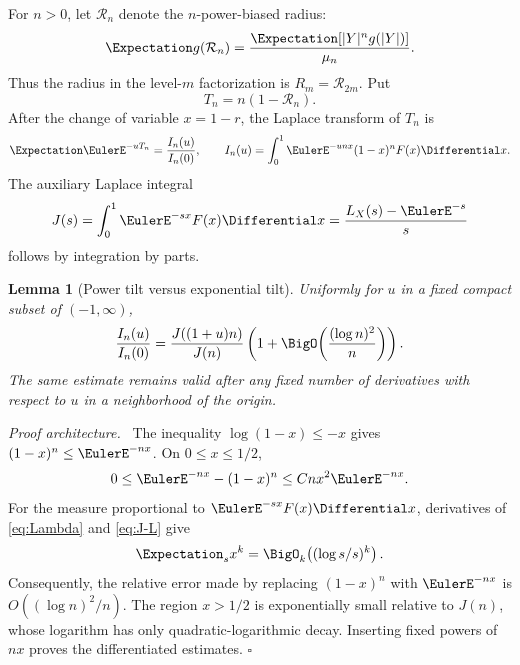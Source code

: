 \documentclass[11pt,oneside]{article}
\newtheorem{lemma}[theorem]{Lemma}
\theoremstyle{definition}
\theoremstyle{remark}
\newenvironment{proofidea}{\par\smallskip\noindent\textit{Proof architecture.}\ }{\hfill$\square$\par\smallskip}
\begin{document}
For $n>0$, let $\mathcal R_n$ denote the $n$-power-biased radius:
\begin{equation}
 \Expectation g(\mathcal R_n)
 =\frac{\Expectation[|Y|^ng(|Y|)]}{\mu_n}.                   \label{eq:Rn-general}
\end{equation}
Thus the radius in the level-$m$ factorization is
$R_m=\mathcal R_{2m}$.  Put
\begin{equation}
 T_n=n(1-\mathcal R_n).                             \label{eq:Tn}
\end{equation}
After the change of variable $x=1-r$, the Laplace transform of $T_n$ is
\begin{equation}
 \Expectation\EulerE^{-uT_n}
 =\frac{I_n(u)}{I_n(0)},
 \qquad
 I_n(u)=\int_0^1\EulerE^{-unx}(1-x)^nF(x)\Differential x.          \label{eq:In}
\end{equation}
The auxiliary Laplace integral
\begin{equation}
 J(s)=\int_0^1\EulerE^{-sx}F(x)\Differential x
 =\frac{L_X(s)-\EulerE^{-s}}{s}                         \label{eq:J-L}
\end{equation}
follows by integration by parts.

\begin{lemma}[Power tilt versus exponential tilt]
\label{lem:power-laplace}
Uniformly for $u$ in a fixed compact subset of $(-1,\infty)$,
\begin{equation}
 \frac{I_n(u)}{I_n(0)}
 =\frac{J((1+u)n)}{J(n)}
  \left(1+\BigO\!\left(\frac{(\log n)^2}{n}\right)\right).     \label{eq:power-laplace}
\end{equation}
The same estimate remains valid after any fixed number of derivatives with
respect to $u$ in a neighborhood of the origin.
\end{lemma}

\begin{proofidea}
The inequality $\log(1-x)\le-x$ gives $(1-x)^n\le\EulerE^{-nx}$.  On
$0\le x\le1/2$,
\[
 0\le \EulerE^{-nx}-(1-x)^n
 \le Cnx^2\EulerE^{-nx}.
\]
For the measure proportional to $\EulerE^{-sx}F(x)\Differential x$, derivatives of
\eqref{eq:Lambda} and \eqref{eq:J-L} give
\[
 \Expectation_s x^k=\BigO_k\!\left((\log s/s)^k\right).
\]
Consequently, the relative error made by replacing $(1-x)^n$ with
$\EulerE^{-nx}$ is $O((\log n)^2/n)$.  The region $x>1/2$ is exponentially small
relative to $J(n)$, whose logarithm has only quadratic-logarithmic decay.
Inserting fixed powers of $nx$ proves the differentiated estimates.
\end{proofidea}
\end{document}
